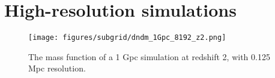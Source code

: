 
\section{High-resolution simulations}
\label{ch:signal:sec:sims}

\begin{figure} %
\begin{center}
\texttt{[image: figures/subgrid/dndm\_1Gpc\_8192\_z2.png]}%
\caption{The mass function of a 1 Gpc simulation at redshift 2, with 0.125 Mpc resolution.}
\label{musicdndm}
\end{center}
\end{figure}


